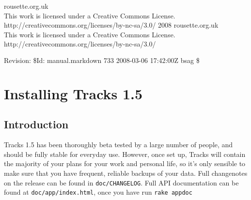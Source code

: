 \documentclass[10pt,twoside]{memoir}
\date{2008-03-06}
\title{\mytitle}
\author{\myauthor}
\def\mychapterstyle{BlueBox}
\def\mypagestyle{myruledpagestyle}
\def\revision{}
\def\mycopyright{2008 rousette.org.uk \\ This work is licensed under a Creative Commons License. \\ http://creativecommons.org/licenses/by-nc-sa/3.0/}
\def\revision{Revision: \$Id: manual.markdown 733 2008-03-06 17:42:00Z bsag \$}
\begin{document}
\chapterstyle{\mychapterstyle}
\pagestyle{\mypagestyle}

%
%

\frontmatter



\maketitle
\clearpage

\vspace*{\fill}

\setlength{\parindent}{0pt}

\ifx\mycopyright\undefined
\else
	\textcopyright{} \mycopyright
\fi

\revision

\begin{center}
\end{center}

\setlength{\parindent}{1em}
\clearpage

\tableofcontents


%
%


\setlength{\parindent}{0pt}
\setlength{\parskip}{\baselineskip/2}

\mainmatter
\chapter{Installing Tracks 1.5}
\label{installingtracks1.5}

\section{Introduction}
\label{introduction}

Tracks 1.5 has been thoroughly beta tested by a large number of people, and should be fully stable for everyday use. However, once set up, Tracks will contain the majority of your plans for your work and personal life, so it's only sensible to make sure that you have frequent, reliable backups of your data. Full changenotes on the release can be found in \texttt{doc/CHANGELOG}. Full API documentation can be found at \texttt{doc/app/index.html}, once you have run \texttt{rake appdoc}
\end{document}
